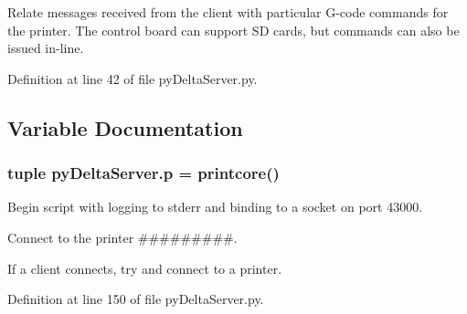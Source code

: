Relate messages received from the client with particular G-\/code commands for the printer. The control board can support S\+D cards, but commands can also be issued in-\/line. 

Definition at line 42 of file py\+Delta\+Server.\+py.



\subsection{Variable Documentation}
\hypertarget{namespacepy_delta_server_a9f57f27f471bef1c4947e6e03b515430}{}
\subsubsection[{p}]{\setlength{\rightskip}{0pt plus 5cm}tuple py\+Delta\+Server.\+p = printcore()}\label{namespacepy_delta_server_a9f57f27f471bef1c4947e6e03b515430}


Begin script with logging to stderr and binding to a socket on port 43000. 

Connect to the printer \#\#\#\#\#\#\#\#\#.

If a client connects, try and connect to a printer. 

Definition at line 150 of file py\+Delta\+Server.\+py.

